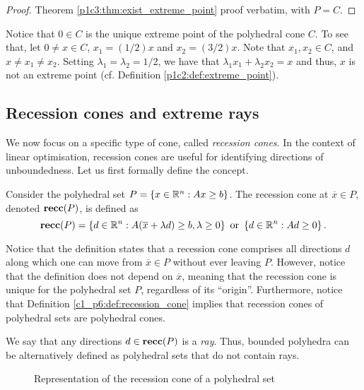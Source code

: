 \begin{proof}
	Theorem \ref{p1c3:thm:exist_extreme_point} proof verbatim, with $P = C$.	
\end{proof}

Notice that $0 \in C$ is the unique extreme point of the polyhedral cone $C$. To see that, let $0 \neq x \in C$, $x_1 = (1/2) x$ and $x_2 = (3/2)x$. Note that $x_1, x_2 \in C$, and $x \neq x_1 \neq x_2$. Setting $\lambda_1 = \lambda_2 = 1/2$, we have that $\lambda_1x_1  + \lambda_2x_2 = x$ and thus, $x$ is not an extreme point (cf. Definition \ref{p1c2:def:extreme_point}). 


\subsection{Recession cones and extreme rays} \label{section_621}

We now focus on a specific type of cone, called \emph{recession cones}. In the context of linear optimisation, recession cones are useful for identifying directions of unboundedness. Let us first formally define the concept.

\begin{definition} \label{c1_p6:def:recession_cone}
	Consider the polyhedral set $P = \left\{ x \in \mathbb{R}^n : Ax \geq b \right \}$. The recession cone at $\overline{x} \in P$, denoted ${\bf recc}(P)$, is defined as
	\begin{equation*}
		{\bf recc}(P) = \left\{ d \in \mathbb{R}^n : A(\overline{x} + \lambda d) \geq b, \lambda \geq 0 \right \} \text{ or } \left\{ d \in \mathbb{R}^n : Ad \geq 0 \right \}. 	
	\end{equation*}
\end{definition}

Notice that the definition states that a recession cone comprises all directions $d$ along which one can move from $\overline{x} \in P$ without ever leaving $P$. However, notice that the definition does not depend on $\overline{x}$, meaning that the recession cone is unique for the polyhedral set $P$, regardless of its ``origin''. Furthermore, notice that Definition \ref{c1_p6:def:recession_cone} implies that recession cones of polyhedral sets are polyhedral cones. 

We say that any directions $d \in {\bf recc}(P)$ is a \emph{ray}. Thus, bounded polyhedra can be alternatively defined as polyhedral sets that do not contain rays. 

\begin{figure}[h]
	\caption{Representation of the recession cone of a polyhedral set} \label{p1c6:fig:recession_cone}	
\end{figure}

